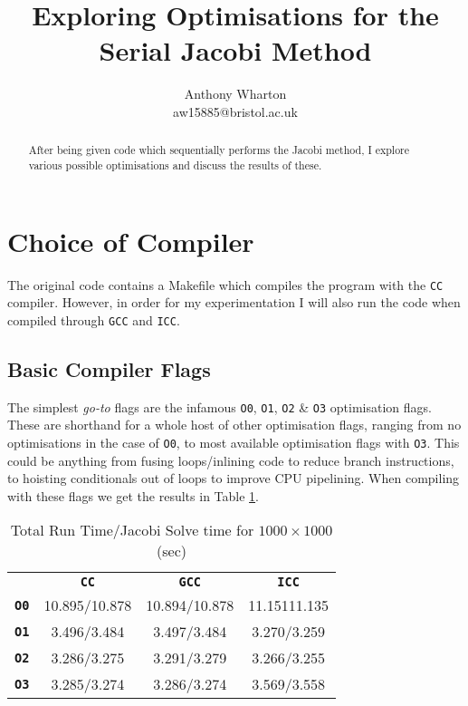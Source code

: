 \documentclass[10pt,twocolumn,a4paper]{article}
\begin{document}
\title{\LARGE\bfseries Exploring Optimisations for the Serial Jacobi Method}
\date{\vspace{-1cm}} %
\author{Anthony Wharton \\ aw15885@bristol.ac.uk}
\maketitle

\begin{abstract}
After being given code which sequentially performs the Jacobi method, I explore various possible optimisations and discuss the results of these.
\end{abstract}


\section{Choice of Compiler}

The original code contains a Makefile which compiles the program with the \texttt{CC} compiler. However, in order for my experimentation I will also run the code when compiled through \texttt{GCC} and \texttt{ICC}.

\subsection{Basic Compiler Flags}
The simplest \textit{go-to} flags are the infamous \texttt{O0}, \texttt{O1}, \texttt{O2} \& \texttt{O3} optimisation flags. These are shorthand for a whole host of other optimisation flags\cite{gcc-docs-optimisations}, ranging from no optimisations in the case of \texttt{O0}, to most available optimisation flags with \texttt{O3}. This could be anything from fusing loops/inlining code to reduce branch instructions, to hoisting conditionals out of loops to improve CPU pipelining. When compiling with these flags we get the results in Table \ref{stockResults}.

\begin{table}[b]
\small
\centering
\begin{tabular}{l|c|c|c}
       & \textbf{\texttt{CC}} & \textbf{\texttt{GCC}} & \textbf{\texttt{ICC}} \\
\textbf{\texttt{O0}} & 10.895/10.878 & 10.894/10.878 & 11.15111.135 \\
\textbf{\texttt{O1}} & 3.496/3.484   & 3.497/3.484   & 3.270/3.259  \\
\textbf{\texttt{O2}} & 3.286/3.275   & 3.291/3.279   & 3.266/3.255  \\
\textbf{\texttt{O3}} & 3.285/3.274   & 3.286/3.274   & 3.569/3.558
\end{tabular}
\caption{Total Run Time/Jacobi Solve time \newline for $1000\times1000$ (sec)}
\label{stockResults}
\end{table}\par
\end{document}
